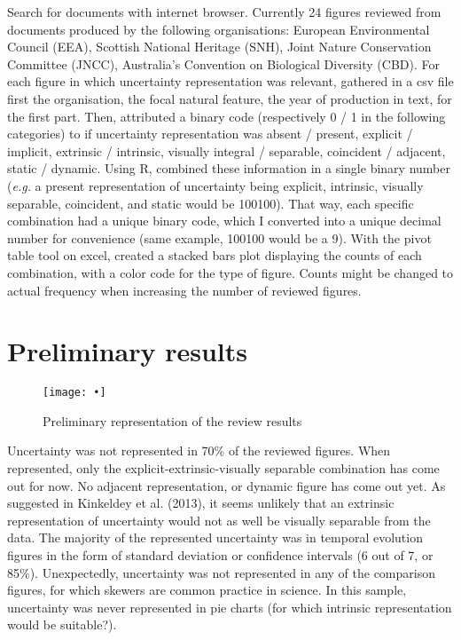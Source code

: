 \documentclass[12pt,a4paper,draft]{article}
\begin{document}
Search for documents with internet browser.
Currently 24 figures reviewed from documents produced by the following organisations: European Environmental Council (EEA), Scottish National Heritage (SNH), Joint Nature Conservation Committee (JNCC), Australia's Convention on Biological Diversity (CBD).
For each figure in which uncertainty representation was relevant, gathered in a csv file first the organisation, the focal natural feature, the year of production in text, for the first part.
Then, attributed a binary code (respectively 0 / 1 in the following categories) to if uncertainty representation was absent / present, explicit / implicit, extrinsic / intrinsic, visually integral / separable, coincident / adjacent, static / dynamic.
Using R, combined these information in a single binary number (\textit{e.g.} a present representation of uncertainty being explicit, intrinsic, visually separable, coincident, and static would be 100100).
That way, each specific combination had a unique binary code, which I converted into a unique decimal number for convenience (same example, 100100 would be a 9).
With the pivot table tool on excel, created a stacked bars plot displaying the counts of each combination, with a color code for the type of figure.
Counts might be changed to actual frequency when increasing the number of reviewed figures.

\section{Preliminary results}

\begin{figure}
\centering
\texttt{[image: •]}
\caption{Preliminary representation of the review results}
\label{prelifig}
\end{figure}

Uncertainty was not represented in 70\% of the reviewed figures.
When represented, only the explicit-extrinsic-visually separable combination has come out for now.
No adjacent representation, or dynamic figure has come out yet.
As suggested in Kinkeldey et al. (2013), it seems unlikely that an extrinsic representation of uncertainty would not as well be visually separable from the data.
The majority of the represented uncertainty was in temporal evolution figures in the form of standard deviation or confidence intervals (6 out of 7, or 85\%).
Unexpectedly, uncertainty was not represented in any of the comparison figures, for which skewers are common practice in science.
In this sample, uncertainty was never represented in pie charts (for which intrinsic representation would be suitable?).
\end{document}
